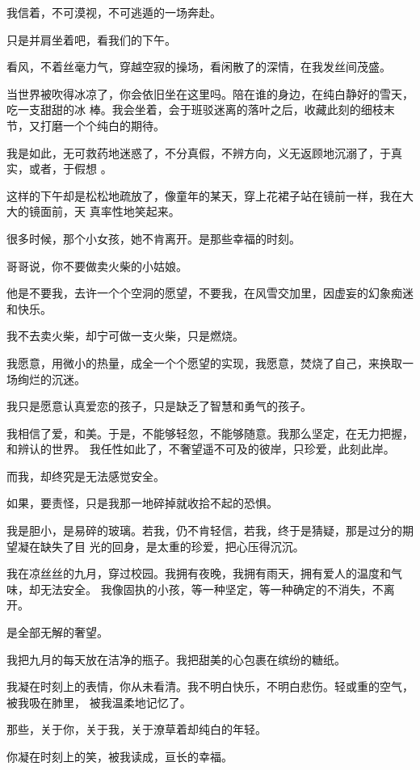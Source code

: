 \documentclass[12pt,a4paper]{article}
\def\blankrev{\vspace{1ex}}									%
\begin{document}
		我信着，不可漠视，不可逃遁的一场奔赴。


		\blankrev
		只是并肩坐着吧，看我们的下午。

		看风，不着丝毫力气，穿越空寂的操场，看闲散了的深情，在我发丝间茂盛。

		当世界被吹得冰凉了，你会依旧坐在这里吗。陪在谁的身边，在纯白静好的雪天，吃一支甜甜的冰
	棒。我会坐着，会于班驳迷离的落叶之后，收藏此刻的细枝末节，又打磨一个个纯白的期待。

		我是如此，无可救药地迷惑了，不分真假，不辨方向，义无返顾地沉溺了，于真实，或者，于假想
	。

		这样的下午却是松松地疏放了，像童年的某天，穿上花裙子站在镜前一样，我在大大的镜面前，天
	真率性地笑起来。

		很多时候，那个小女孩，她不肯离开。是那些幸福的时刻。


		哥哥说，你不要做卖火柴的小姑娘。

		他是不要我，去许一个个空洞的愿望，不要我，在风雪交加里，因虚妄的幻象痴迷和快乐。

		我不去卖火柴，却宁可做一支火柴，只是燃烧。

		我愿意，用微小的热量，成全一个个愿望的实现，我愿意，焚烧了自己，来换取一场绚烂的沉迷。

		我只是愿意认真爱恋的孩子，只是缺乏了智慧和勇气的孩子。

		我相信了爱，和美。于是，不能够轻忽，不能够随意。我那么坚定，在无力把握，和辨认的世界。
	我任性如此了，不奢望遥不可及的彼岸，只珍爱，此刻此岸。


		而我，却终究是无法感觉安全。

		如果，要责怪，只是我那一地碎掉就收拾不起的恐惧。

		我是胆小，是易碎的玻璃。若我，仍不肯轻信，若我，终于是猜疑，那是过分的期望凝在缺失了目
	光的回身，是太重的珍爱，把心压得沉沉。

		我在凉丝丝的九月，穿过校园。我拥有夜晚，我拥有雨天，拥有爱人的温度和气味，却无法安全。
	我像固执的小孩，等一种坚定，等一种确定的不消失，不离开。

		是全部无解的奢望。


		\blankrev
		我把九月的每天放在洁净的瓶子。我把甜美的心包裹在缤纷的糖纸。

		我凝在时刻上的表情，你从未看清。我不明白快乐，不明白悲伤。轻或重的空气，被我吸在肺里，
	被我温柔地记忆了。

		那些，关于你，关于我，关于潦草着却纯白的年轻。

		你凝在时刻上的笑，被我读成，亘长的幸福。
\end{document}
